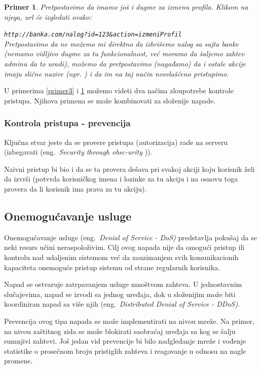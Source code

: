 \documentclass[a4paper]{article}
\newtheorem{primer}{Primer}[section]
\begin{document}
\begin{primer}
\label{primer4}
Pretpostavimo da imamo još i dugme za izmenu profila. Klikom na njega, url će izgledati ovako:

\texttt{http://banka.com/nalog?id=123\&{}action=izmeniProfil}\\
Pretpostavimo da ne možemo mi direktno da izbrišemo nalog sa sajta banke (nemamo vidljivo dugme za tu funkcionalnost, već moramo da šaljemo zahtev adminu da to uradi), možemo da pretpostavimo (nagađamo) da i ostale akcije imaju slične nazive (npr. ) i da im na taj način neovlašćeno pristupimo.\\
\end{primer}
U primerima \ref{primer3} i \ref{primer4} možemo videti dva načina zloupotrebe kontrole pristupa. Njihova primena se može kombinovati za složenije napade.

\subsubsection{Kontrola pristupa - prevencija}

Ključna stvar jeste da se provere pristupa (autorizacija) rade na serveru (izbegavati (eng.~{\em Security through obsc-urity} \cite{AS})). 

Naivni pristup bi bio i da se ta provera dešava pri svakoj akciji koju korisnik želi da izvrši (potvrda korisničkog imena i lozinke za tu akciju i na osnovu toga provera da li korisnik ima prava za tu akciju).

\subsection{Onemogućavanje usluge}
Onemogućavanje usluge (eng.~{\em Denial of Service - DoS)} \cite{DoSM} predstavlja pokušaj da se neki resurs učini neraspoloživim. Cilj ovog napada nije da omogući pristup ili kontrolu nad udaljenim sistemom već da zauzimanjem svih komunikacionih kapaciteta onemoguće pristup sistemu od strane regularnih korisnika.

Napad se ostvaruje zatrpavanjem usluge mnoštvom zahteva. U jednostavnim slučajevima, napad se izvodi sa jednog uređaja, dok u složenijim može biti koordiniran napad sa više njih (eng.~{\em Distributed Denial of Service - DDoS)}.

Prevencija ovog tipa napada se može implementirati na nivou mreže. Na primer, na nivou zaštitnog zida se može blokirati saobraćaj uređaja sa kog se šalju sumnjivi zahtevi. Još jedan vid prevencije bi bilo nadgledanje mreže i vođenje statistike o prosečnom broju pristiglih zahteva i reagovanje u odnosu na nagle promene.
\end{document}
